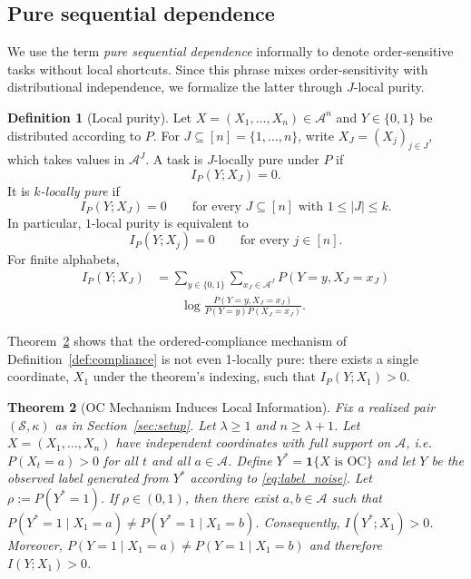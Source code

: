 \documentclass{article} %
\theoremstyle{plain}
\newtheorem{theorem}{Theorem}[section]
\theoremstyle{definition}
\newtheorem{definition}[theorem]{Definition}
\theoremstyle{remark}
\begin{document}
\subsection{Pure sequential dependence}
\label{sec:pure_sequential_def}
We use the term \emph{pure sequential dependence} informally to denote order-sensitive tasks without local shortcuts. Since this phrase mixes order-sensitivity with distributional independence, we formalize the latter through $J$-local purity.

\begin{definition}[Local purity]
\label{def:local_purity}
Let \(X=(X_1,\ldots,X_n)\in\mathcal A^n\) and \(Y\in\{0,1\}\)
be distributed according to \(P\). For \(J\subseteq [n] = \{1, \ldots, n\}\), write
\(X_J=(X_j)_{j\in J}\), which takes values in \(\mathcal A^J\).
A task is \(J\)-locally pure under \(P\) if
\[
I_P(Y;X_J)=0.
\]
It is \emph{\(k\)-locally pure} if
\[
I_P(Y;X_J)=0
\qquad
\text{for every } J\subseteq [n] \text{ with } 1\le |J|\le k.
\]
In particular, \(1\)-local purity is equivalent to
\[
I_P(Y;X_j)=0
\qquad
\text{for every } j\in[n].
\]
For finite alphabets,
\[
\begin{aligned}
I_P(Y;X_J)
&=
\sum_{y\in\{0,1\}}
\sum_{x_J\in\mathcal A^J}
P(Y=y,X_J=x_J)\\
&\qquad
\log
\frac{
P(Y=y,X_J=x_J)
}{
P(Y=y)P(X_J=x_J)
}.
\end{aligned}
\]
\end{definition}

Theorem~\ref{thm:impossibility} shows that the ordered-compliance mechanism of Definition~\ref{def:compliance} is not even 1-locally pure: there exists a single coordinate, $X_1$ under the theorem's indexing, such that $I_P(Y;X_1)>0$.

\begin{theorem}[OC Mechanism Induces Local Information]
\label{thm:impossibility}
Fix a realized pair $(\mathcal{S},\kappa)$ as in Section~\ref{sec:setup}.
Let $\lambda \ge 1$ and $n \ge \lambda+1$.
Let $X=(X_1,\ldots,X_n)$ have independent coordinates with full support on
$\mathcal{A}$, i.e.\ $P(X_t=a)>0$ for all $t$ and all $a\in\mathcal{A}$.
Define
$Y^* = \mathbf{1}\{X \text{ is OC}\}$ and let $Y$ be the observed label generated from $Y^*$ according to
\eqref{eq:label_noise}. Let $\rho := P(Y^*=1)$.
If $\rho\in(0,1)$, then there exist $a,b\in\mathcal{A}$ such that $P(Y^*=1\mid X_1=a)\neq P(Y^*=1\mid X_1=b)$.
Consequently, $I(Y^*;X_1)>0$. Moreover, $P(Y=1\mid X_1=a)\neq P(Y=1\mid X_1=b)$ and therefore $I(Y;X_1)>0$.
\end{theorem}
\end{document}
